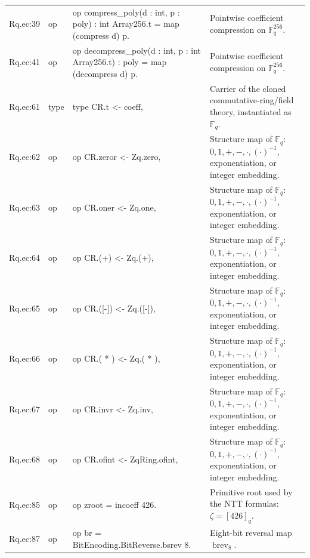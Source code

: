 \documentclass[10pt]{article}
\begin{document}
\begin{longtable}{L{0.11\textwidth}L{0.05\textwidth}L{0.38\textwidth}L{0.42\textwidth}}
Rq.\allowbreak{}ec:\allowbreak{}39 & op & {\ttfamily\scriptsize op compress\_poly(d : int, p : poly) : int Array256.t =  map (compress d) p.} & Pointwise coefficient compression on $\mathbb F_q^{256}$. \\
Rq.\allowbreak{}ec:\allowbreak{}41 & op & {\ttfamily\scriptsize op decompress\_poly(d : int, p : int Array256.t) : poly =  map (decompress d) p.} & Pointwise coefficient compression on $\mathbb F_q^{256}$. \\
Rq.\allowbreak{}ec:\allowbreak{}61 & type & {\ttfamily\scriptsize type  CR.t     <- coeff,} & Carrier of the cloned commutative-ring/field theory, instantiated as $\mathbb F_q$. \\
Rq.\allowbreak{}ec:\allowbreak{}62 & op & {\ttfamily\scriptsize op  CR.zeror <- Zq.zero,} & Structure map of $\mathbb F_q$: $0,1,+,-,\cdot,(\cdot)^{-1}$, exponentiation, or integer embedding. \\
Rq.\allowbreak{}ec:\allowbreak{}63 & op & {\ttfamily\scriptsize op  CR.oner  <- Zq.one,} & Structure map of $\mathbb F_q$: $0,1,+,-,\cdot,(\cdot)^{-1}$, exponentiation, or integer embedding. \\
Rq.\allowbreak{}ec:\allowbreak{}64 & op & {\ttfamily\scriptsize op  CR.(+)   <- Zq.(+),} & Structure map of $\mathbb F_q$: $0,1,+,-,\cdot,(\cdot)^{-1}$, exponentiation, or integer embedding. \\
Rq.\allowbreak{}ec:\allowbreak{}65 & op & {\ttfamily\scriptsize op  CR.([-]) <- Zq.([-]),} & Structure map of $\mathbb F_q$: $0,1,+,-,\cdot,(\cdot)^{-1}$, exponentiation, or integer embedding. \\
Rq.\allowbreak{}ec:\allowbreak{}66 & op & {\ttfamily\scriptsize op  CR.( * ) <- Zq.( * ),} & Structure map of $\mathbb F_q$: $0,1,+,-,\cdot,(\cdot)^{-1}$, exponentiation, or integer embedding. \\
Rq.\allowbreak{}ec:\allowbreak{}67 & op & {\ttfamily\scriptsize op  CR.invr  <- Zq.inv,} & Structure map of $\mathbb F_q$: $0,1,+,-,\cdot,(\cdot)^{-1}$, exponentiation, or integer embedding. \\
Rq.\allowbreak{}ec:\allowbreak{}68 & op & {\ttfamily\scriptsize op  CR.ofint <- ZqRing.ofint,} & Structure map of $\mathbb F_q$: $0,1,+,-,\cdot,(\cdot)^{-1}$, exponentiation, or integer embedding. \\
Rq.\allowbreak{}ec:\allowbreak{}85 & op & {\ttfamily\scriptsize op zroot = incoeff 426.} & Primitive root used by the NTT formulas: $\zeta=[426]_q$. \\
Rq.\allowbreak{}ec:\allowbreak{}87 & op & {\ttfamily\scriptsize op br = BitEncoding.BitReverse.bsrev 8.} & Eight-bit reversal map $\operatorname{brev}_8$. \\

\end{longtable}
\end{document}
